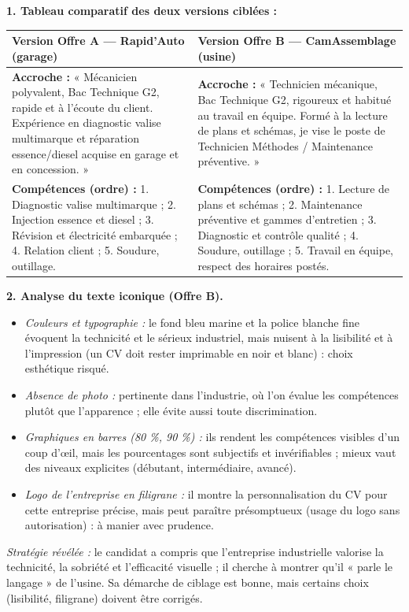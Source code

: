 \documentclass[11pt]{article}
\begin{document}
\begin{corrige}
\textbf{1. Tableau comparatif des deux versions ciblées :}

\begin{center}
\begin{tabularx}{\linewidth}{|X|X|}
\hline
\rowcolor{popblueL} \textbf{Version Offre A — Rapid'Auto (garage)} & \textbf{Version Offre B — CamAssemblage (usine)} \\
\hline
\textbf{Accroche :} « Mécanicien polyvalent, Bac Technique G2, rapide et à l'écoute du client. Expérience en diagnostic valise multimarque et réparation essence/diesel acquise en garage et en concession. » & \textbf{Accroche :} « Technicien mécanique, Bac Technique G2, rigoureux et habitué au travail en équipe. Formé à la lecture de plans et schémas, je vise le poste de Technicien Méthodes / Maintenance préventive. » \\
\hline
\textbf{Compétences (ordre) :} 1. Diagnostic valise multimarque ; 2. Injection essence et diesel ; 3. Révision et électricité embarquée ; 4. Relation client ; 5. Soudure, outillage. & \textbf{Compétences (ordre) :} 1. Lecture de plans et schémas ; 2. Maintenance préventive et gammes d'entretien ; 3. Diagnostic et contrôle qualité ; 4. Soudure, outillage ; 5. Travail en équipe, respect des horaires postés. \\
\hline
\end{tabularx}
\end{center}

\textbf{2. Analyse du texte iconique (Offre B).}
\begin{itemize}
\item \emph{Couleurs et typographie :} le fond bleu marine et la police blanche fine évoquent la technicité et le sérieux industriel, mais nuisent à la lisibilité et à l'impression (un CV doit rester imprimable en noir et blanc) : choix esthétique risqué.
\item \emph{Absence de photo :} pertinente dans l'industrie, où l'on évalue les compétences plutôt que l'apparence ; elle évite aussi toute discrimination.
\item \emph{Graphiques en barres (80 \%, 90 \%) :} ils rendent les compétences visibles d'un coup d'œil, mais les pourcentages sont subjectifs et invérifiables ; mieux vaut des niveaux explicites (débutant, intermédiaire, avancé).
\item \emph{Logo de l'entreprise en filigrane :} il montre la personnalisation du CV pour cette entreprise précise, mais peut paraître présomptueux (usage du logo sans autorisation) : à manier avec prudence.
\end{itemize}
\emph{Stratégie révélée :} le candidat a compris que l'entreprise industrielle valorise la technicité, la sobriété et l'efficacité visuelle ; il cherche à montrer qu'il « parle le langage » de l'usine. Sa démarche de ciblage est bonne, mais certains choix (lisibilité, filigrane) doivent être corrigés.


\end{corrige}
\end{document}
